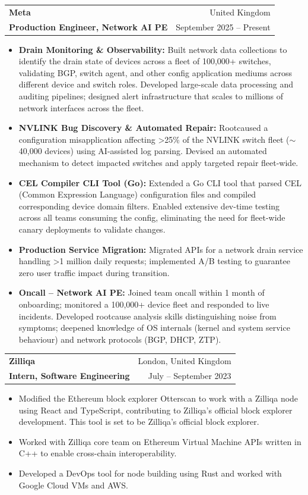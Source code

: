 \documentclass[a4paper,11pt]{article}
\makeatletter
\newcommand{\resumeItem}[2]{
  \item[--]
    \textbf{#1}{#2 \vspace{-2pt}}
  }
\newcommand{\resumeSubheading}[4]{
  \vspace{-1pt}\item
    \begin{tabular*}{0.97\textwidth}{l@{\extracolsep{\fill}}r}
      \textbf{#1} & \small{#2} \\
      \textbf{#3} &  \small{#4} \\
    \end{tabular*}\vspace{-5pt}
}
\newcommand{\resumeItemListStart}{\begin{itemize}
    [labelsep=1ex, itemindent=0em, leftmargin=1em
    ]}
\newcommand{\resumeItemListEnd}{\end{itemize}\vspace{-5pt}}
\makeatother
\begin{document}
{{    \resumeSubheading
    {Meta}{United Kingdom}
    {Production Engineer, Network AI PE}{September 2025 -- Present}
    \resumeItemListStart
    \resumeItem{Drain Monitoring \& Observability: }{Built network data
	    collections to identify the drain state of devices across a fleet of
	    100,000+ switches, validating BGP, switch agent, and other config
	    application mediums across different device and switch roles. Developed
	    large-scale data processing and auditing pipelines; designed alert
	    infrastructure that scales to millions of network interfaces across the
	    fleet.}
    \resumeItem{NVLINK Bug Discovery \& Automated Repair: }{Rootcaused a
	    configuration misapplication affecting \textgreater25\% of the NVLINK
	    switch fleet ($\sim$40,000 devices) using AI-assisted log parsing. Devised
	    an automated mechanism to detect impacted switches and apply targeted
	    repair fleet-wide.}
    \resumeItem{CEL Compiler CLI Tool (Go): }{Extended a Go CLI tool that
	    parsed CEL (Common Expression Language) configuration files and compiled
	    corresponding device domain filters. Enabled extensive dev-time testing
	    across all teams consuming the config, eliminating the need for fleet-wide
	    canary deployments to validate changes.}
    \resumeItem{Production Service Migration: }{Migrated APIs for a network
	    drain service handling \textgreater1 million daily requests; implemented
	    A/B testing to guarantee zero user traffic impact during transition.}
    \resumeItem{Oncall -- Network AI PE: }{Joined team oncall within 1 month
	    of onboarding; monitored a 100,000+ device fleet and responded to live
	    incidents. Developed rootcause analysis skills distinguishing noise from
	    symptoms; deepened knowledge of OS internals (kernel and system service
	    behaviour) and network protocols (BGP, DHCP, ZTP).}
    \resumeItemListEnd

    \resumeSubheading
    {Zilliqa}{London, United Kingdom}
    {Intern, Software Engineering}{July -- September 2023}
    \resumeItemListStart
    \resumeItem{}{Modified the Ethereum block explorer Otterscan to work with
	    a Zilliqa node using React and TypeScript, contributing to Zilliqa’s
	    official block explorer development. This tool is set to be Zilliqa’s
	    official block explorer. }
    \resumeItem{}{Worked with Zilliqa core team on Ethereum Virtual Machine
	    APIs written in C++ to enable cross-chain interoperability.}
    \resumeItem{}{Developed a  DevOps tool for node building using Rust and
	    worked with Google Cloud VMs and AWS.}
    \resumeItemListEnd

}}
\end{document}
